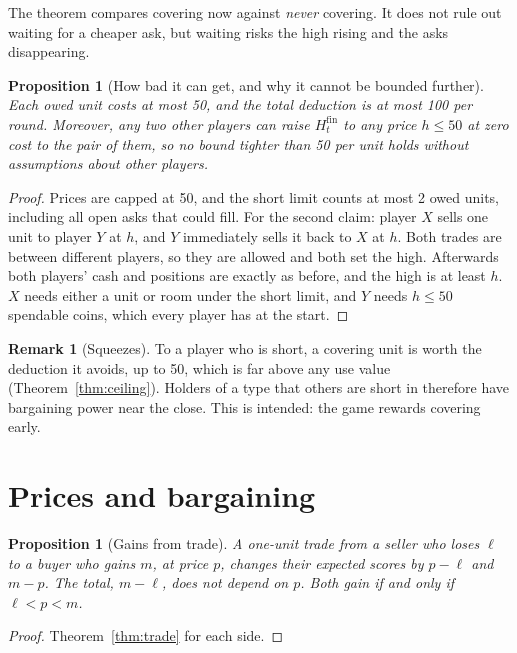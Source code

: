 \documentclass[11pt]{article}
\newtheorem{proposition}[theorem]{Proposition}
\theoremstyle{definition}
\newtheorem{remark}[theorem]{Remark}
\newcommand{\Hf}{H^{\mathrm{fin}}}
\begin{document}
The theorem compares covering now against \emph{never} covering. It does not rule out waiting for a cheaper ask, but waiting risks the high rising and the asks disappearing.

\begin{proposition}[How bad it can get, and why it cannot be bounded further]\label{prop:worst}
Each owed unit costs at most 50, and the total deduction is at most 100 per round. Moreover, any two other players can raise $\Hf_t$ to any price $h \le 50$ at zero cost to the pair of them, so no bound tighter than 50 per unit holds without assumptions about other players.
\end{proposition}
\begin{proof}
Prices are capped at 50, and the short limit counts at most 2 owed units, including all open asks that could fill. For the second claim: player $X$ sells one unit to player $Y$ at $h$, and $Y$ immediately sells it back to $X$ at $h$. Both trades are between different players, so they are allowed and both set the high. Afterwards both players' cash and positions are exactly as before, and the high is at least $h$. $X$ needs either a unit or room under the short limit, and $Y$ needs $h \le 50$ spendable coins, which every player has at the start.
\end{proof}

\begin{remark}[Squeezes]
To a player who is short, a covering unit is worth the deduction it avoids, up to 50, which is far above any use value (Theorem~\ref{thm:ceiling}). Holders of a type that others are short in therefore have bargaining power near the close. This is intended: the game rewards covering early.
\end{remark}

\section{Prices and bargaining}

\begin{proposition}[Gains from trade]\label{prop:bargain}
A one-unit trade from a seller who loses $\ell$ to a buyer who gains $m$, at price $p$, changes their expected scores by $p - \ell$ and $m - p$. The total, $m - \ell$, does not depend on $p$. Both gain if and only if $\ell < p < m$.
\end{proposition}
\begin{proof}
Theorem~\ref{thm:trade} for each side.
\end{proof}
\end{document}
